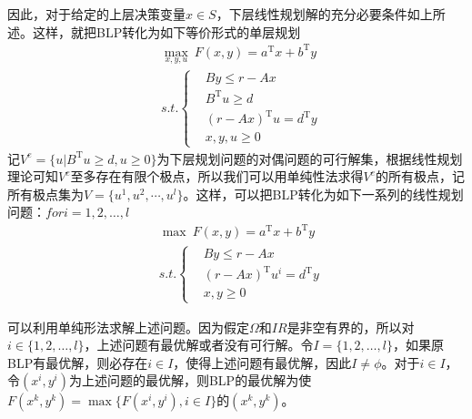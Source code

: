     \par
    因此，对于给定的上层决策变量$x \in S$，下层线性规划解的充分必要条件如上所述。这样，就把BLP转化为如下等价形式的单层规划
    \begin{align*}
        &\mathop{\max}\limits_{x,y,u}\  F(x,y)=a^\mathrm{T} x+b^\mathrm{T} y\\
        &s.t.\left\{
        \begin{aligned}
        & By\leqslant r-Ax\\
        & B^\mathrm{T} u\geqslant d\\
        & (r-Ax)^\mathrm{T} u=d^\mathrm{T} y\\
        & x,y,u \geqslant 0
        \end{aligned}
            \right.
    \end{align*}
    记$V^e=\{u|B^\mathrm{T} u\geqslant d,u\geqslant 0\}$为下层规划问题的对偶问题的可行解集，根据线性规划理论可知$V^e$至多存在有限个极点，所以我们可以用单纯性法求得$V^e$的所有极点，记所有极点集为$V=\{u^1,u^2,\cdots,u^l\}$。这样，可以把BLP转化为如下一系列的线性规划问题：$for i = 1,2,\dots,l$
    \begin{align*}
        &{\max}\  F(x,y)=a^\mathrm{T} x+b^\mathrm{T} y\\
        &s.t.\left\{
        \begin{aligned}
        & By\leqslant r-Ax\\
        & (r-Ax)^\mathrm{T} u^i=d^\mathrm{T} y\\
        & x,y \geqslant 0
        \end{aligned}
            \right.
    \end{align*}
    \par
    可以利用单纯形法求解上述问题。因为假定$\Omega$和$IR$是非空有界的，所以对$i\in \{1,2,\ldots ,l\}$，上述问题有最优解或者没有可行解。令$I=\{1,2,\ldots ,l\}$，如果原BLP有最优解，则必存在$i \in I$，使得上述问题有最优解，因此$I\neq \phi$。对于$i \in I$，令$(x^i,y^i)$为上述问题的最优解，则BLP的最优解为使$F(x^k,y^k)=\max\{F(x^i,y^i),i \in I\}$的$(x^k,y^k)$。
